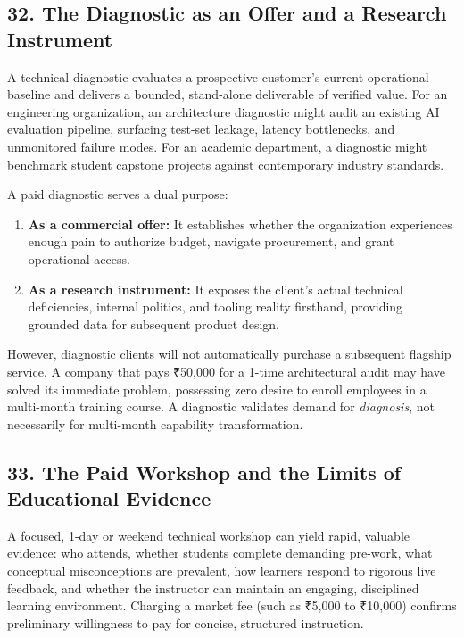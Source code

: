 \subsection*{32. The Diagnostic as an Offer and a Research Instrument}

A technical diagnostic evaluates a prospective customer's current operational baseline and delivers a bounded, stand-alone deliverable of verified value. For an engineering organization, an architecture diagnostic might audit an existing AI evaluation pipeline, surfacing test-set leakage, latency bottlenecks, and unmonitored failure modes. For an academic department, a diagnostic might benchmark student capstone projects against contemporary industry standards.

A paid diagnostic serves a dual purpose:
\begin{enumerate}
    \item \textbf{As a commercial offer:} It establishes whether the organization experiences enough pain to authorize budget, navigate procurement, and grant operational access.
    \item \textbf{As a research instrument:} It exposes the client's actual technical deficiencies, internal politics, and tooling reality firsthand, providing grounded data for subsequent product design.
\end{enumerate}

However, diagnostic clients will not automatically purchase a subsequent flagship service. A company that pays ₹50,000 for a 1-time architectural audit may have solved its immediate problem, possessing zero desire to enroll employees in a multi-month training course. A diagnostic validates demand for \emph{diagnosis}, not necessarily for multi-month capability transformation.

\subsection*{33. The Paid Workshop and the Limits of Educational Evidence}

A focused, 1-day or weekend technical workshop can yield rapid, valuable evidence: who attends, whether students complete demanding pre-work, what conceptual misconceptions are prevalent, how learners respond to rigorous live feedback, and whether the instructor can maintain an engaging, disciplined learning environment. Charging a market fee (such as ₹5,000 to ₹10,000) confirms preliminary willingness to pay for concise, structured instruction.

